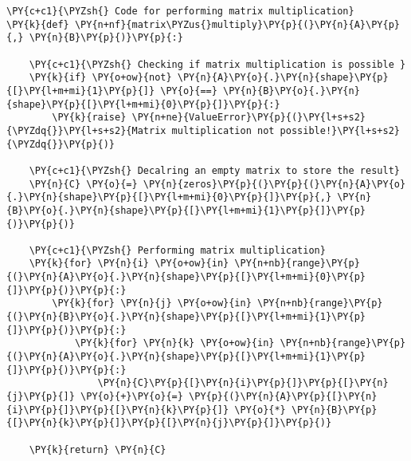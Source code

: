     \begin{tcolorbox}[breakable, size=fbox, boxrule=1pt, pad at break*=1mm,colback=cellbackground, colframe=cellborder]
\begin{Verbatim}[commandchars=\\\{\}]
\PY{c+c1}{\PYZsh{} Code for performing matrix multiplication}
\PY{k}{def} \PY{n+nf}{matrix\PYZus{}multiply}\PY{p}{(}\PY{n}{A}\PY{p}{,} \PY{n}{B}\PY{p}{)}\PY{p}{:}
    
    \PY{c+c1}{\PYZsh{} Checking if matrix multiplication is possible }
    \PY{k}{if} \PY{o+ow}{not} \PY{n}{A}\PY{o}{.}\PY{n}{shape}\PY{p}{[}\PY{l+m+mi}{1}\PY{p}{]} \PY{o}{==} \PY{n}{B}\PY{o}{.}\PY{n}{shape}\PY{p}{[}\PY{l+m+mi}{0}\PY{p}{]}\PY{p}{:}
        \PY{k}{raise} \PY{n+ne}{ValueError}\PY{p}{(}\PY{l+s+s2}{\PYZdq{}}\PY{l+s+s2}{Matrix multiplication not possible!}\PY{l+s+s2}{\PYZdq{}}\PY{p}{)}
  
    \PY{c+c1}{\PYZsh{} Decalring an empty matrix to store the result}
    \PY{n}{C} \PY{o}{=} \PY{n}{zeros}\PY{p}{(}\PY{p}{(}\PY{n}{A}\PY{o}{.}\PY{n}{shape}\PY{p}{[}\PY{l+m+mi}{0}\PY{p}{]}\PY{p}{,} \PY{n}{B}\PY{o}{.}\PY{n}{shape}\PY{p}{[}\PY{l+m+mi}{1}\PY{p}{]}\PY{p}{)}\PY{p}{)}

    \PY{c+c1}{\PYZsh{} Performing matrix multiplication}
    \PY{k}{for} \PY{n}{i} \PY{o+ow}{in} \PY{n+nb}{range}\PY{p}{(}\PY{n}{A}\PY{o}{.}\PY{n}{shape}\PY{p}{[}\PY{l+m+mi}{0}\PY{p}{]}\PY{p}{)}\PY{p}{:}
        \PY{k}{for} \PY{n}{j} \PY{o+ow}{in} \PY{n+nb}{range}\PY{p}{(}\PY{n}{B}\PY{o}{.}\PY{n}{shape}\PY{p}{[}\PY{l+m+mi}{1}\PY{p}{]}\PY{p}{)}\PY{p}{:}
            \PY{k}{for} \PY{n}{k} \PY{o+ow}{in} \PY{n+nb}{range}\PY{p}{(}\PY{n}{A}\PY{o}{.}\PY{n}{shape}\PY{p}{[}\PY{l+m+mi}{1}\PY{p}{]}\PY{p}{)}\PY{p}{:}
                \PY{n}{C}\PY{p}{[}\PY{n}{i}\PY{p}{]}\PY{p}{[}\PY{n}{j}\PY{p}{]} \PY{o}{+}\PY{o}{=} \PY{p}{(}\PY{n}{A}\PY{p}{[}\PY{n}{i}\PY{p}{]}\PY{p}{[}\PY{n}{k}\PY{p}{]} \PY{o}{*} \PY{n}{B}\PY{p}{[}\PY{n}{k}\PY{p}{]}\PY{p}{[}\PY{n}{j}\PY{p}{]}\PY{p}{)}

    \PY{k}{return} \PY{n}{C}
\end{Verbatim}
\end{tcolorbox}

